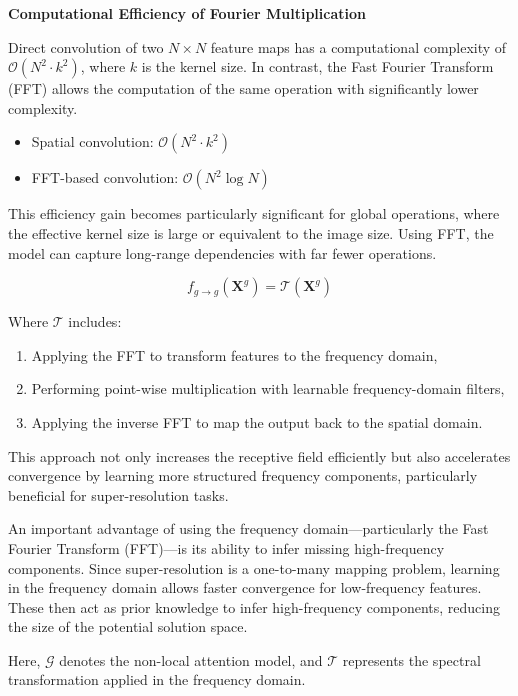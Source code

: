 \textbf{Computational Efficiency of Fourier Multiplication}

Direct convolution of two $N \times N$ feature maps has a computational complexity of $\mathcal{O}(N^2 \cdot k^2)$, where $k$ is the kernel size. In contrast, the Fast Fourier Transform (FFT) allows the computation of the same operation with significantly lower complexity.

\begin{itemize}
    \item Spatial convolution: $\mathcal{O}(N^2 \cdot k^2)$
    \item FFT-based convolution: $\mathcal{O}(N^2 \log N)$
\end{itemize}

This efficiency gain becomes particularly significant for global operations, where the effective kernel size is large or equivalent to the image size. Using FFT, the model can capture long-range dependencies with far fewer operations.


\begin{equation}
f_{g \rightarrow g}(\mathbf{X}^g) = \mathcal{T}(\mathbf{X}^g)
\end{equation}

Where $\mathcal{T}$ includes:
\begin{enumerate}
    \item Applying the FFT to transform features to the frequency domain,
    \item Performing point-wise multiplication with learnable frequency-domain filters,
    \item Applying the inverse FFT to map the output back to the spatial domain.
\end{enumerate}

This approach not only increases the receptive field efficiently but also accelerates convergence by learning more structured frequency components, particularly beneficial for super-resolution tasks.

An important advantage of using the frequency domain---particularly the Fast Fourier Transform (FFT)---is its ability to infer missing high-frequency components. Since super-resolution is a one-to-many mapping problem, learning in the frequency domain allows faster convergence for low-frequency features. These then act as prior knowledge to infer high-frequency components, reducing the size of the potential solution space.

Here, $\mathcal{G}$ denotes the non-local attention model, and $\mathcal{T}$ represents the spectral transformation applied in the frequency domain.

